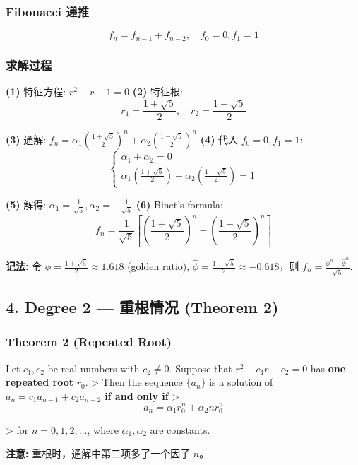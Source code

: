 \documentclass[10pt,a4paper,openany]{ctexbook}
\theoremstyle{definition}
\theoremstyle{remark}
\renewenvironment{quote}
  {\list{}{\leftmargin=1em\rightmargin=0pt\topsep=0.5pt\partopsep=0pt}\item[]}
  {\endlist}
\begin{document}
\subsubsection{Fibonacci 递推}

\[
f_n = f_{n-1} + f_{n-2}, \quad f_0 = 0, f_1 = 1
\]

\subsubsection{求解过程}

\textbf{(1)} 特征方程: $r^2 - r - 1 = 0$
\textbf{(2)} 特征根:
\[
r_1 = \frac{1 + \sqrt{5}}{2}, \quad r_2 = \frac{1 - \sqrt{5}}{2}
\]

\textbf{(3)} 通解: $f_n = \alpha_1 \left(\frac{1+\sqrt{5}}{2}\right)^n + \alpha_2 \left(\frac{1-\sqrt{5}}{2}\right)^n$
\textbf{(4)} 代入 $f_0 = 0, f_1 = 1$:
\[
\begin{cases}
\alpha_1 + \alpha_2 = 0 \\
\alpha_1 \left(\frac{1+\sqrt{5}}{2}\right) + \alpha_2 \left(\frac{1-\sqrt{5}}{2}\right) = 1
\end{cases}
\]

\textbf{(5)} 解得: $\alpha_1 = \frac{1}{\sqrt{5}}, \alpha_2 = -\frac{1}{\sqrt{5}}$
\textbf{(6)} Binet's formula:
\[
f_n = \frac{1}{\sqrt{5}}\left[\left(\frac{1+\sqrt{5}}{2}\right)^n - \left(\frac{1-\sqrt{5}}{2}\right)^n\right]
\]

\textbf{记法:} 令 $\phi = \frac{1+\sqrt{5}}{2} \approx 1.618$ (golden ratio), $\hat{\phi} = \frac{1-\sqrt{5}}{2} \approx -0.618$，则 $f_n = \frac{\phi^n - \hat{\phi}^n}{\sqrt{5}}$.
\vspace{-2pt}

\subsection{4. Degree 2 — 重根情况 (Theorem 2)}

\subsubsection{Theorem 2 (Repeated Root)}

\begin{quote}
Let $c_1, c_2$ be real numbers with $c_2 \neq 0$. Suppose that $r^2 - c_1 r - c_2 = 0$ has \textbf{one repeated root} $r_0$.
>
Then the sequence $\{a_n\}$ is a solution of $a_n = c_1 a_{n-1} + c_2 a_{n-2}$ \textbf{if and only if}
>
\[
a_n = \alpha_1 r_0^n + \alpha_2 n r_0^n
\]

>
for $n = 0, 1, 2, \dots$, where $\alpha_1, \alpha_2$ are constants.

\textbf{注意:} 重根时，通解中第二项多了一个因子 $n$。

\end{quote}
\vspace{-2pt}
\end{document}
